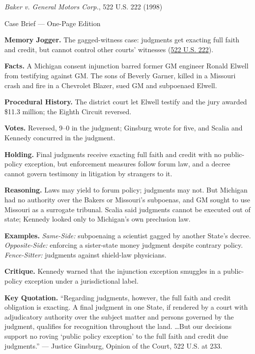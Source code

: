 \documentclass[12pt]{article}
\begin{document}
\begin{center}
{\Large \textit{Baker v. General Motors Corp.}, 522 U.S. 222 (1998)\par}
\vspace{0.3em}
{\normalsize Case Brief --- One-Page Edition\par}
\end{center}

\textbf{Memory Jogger.} The gagged-witness case: judgments get exacting full faith and credit, but cannot control other courts' witnesses (\href{https://supreme.justia.com/cases/federal/us/522/222/}{522 U.S. 222}).

\textbf{Facts.} A Michigan consent injunction barred former GM engineer Ronald Elwell from testifying against GM. The sons of Beverly Garner, killed in a Missouri crash and fire in a Chevrolet Blazer, sued GM and subpoenaed Elwell.

\textbf{Procedural History.} The district court let Elwell testify and the jury awarded \$11.3 million; the Eighth Circuit reversed.

\textbf{Votes.} Reversed, 9--0 in the judgment; Ginsburg wrote for five, and Scalia and Kennedy concurred in the judgment.

\textbf{Holding.} Final judgments receive exacting full faith and credit with no public-policy exception, but enforcement measures follow forum law, and a decree cannot govern testimony in litigation by strangers to it.

\textbf{Reasoning.} Laws may yield to forum policy; judgments may not. But Michigan had no authority over the Bakers or Missouri's subpoenas, and GM sought to use Missouri as a surrogate tribunal. Scalia said judgments cannot be executed out of state; Kennedy looked only to Michigan's own preclusion law.

\textbf{Examples.} \emph{Same-Side:} subpoenaing a scientist gagged by another State's decree. \emph{Opposite-Side:} enforcing a sister-state money judgment despite contrary policy. \emph{Fence-Sitter:} judgments against shield-law physicians.

\textbf{Critique.} Kennedy warned that the injunction exception smuggles in a public-policy exception under a jurisdictional label.

\textbf{Key Quotation.} ``Regarding judgments, however, the full faith and credit obligation is exacting. A final judgment in one State, if rendered by a court with adjudicatory authority over the subject matter and persons governed by the judgment, qualifies for recognition throughout the land. \ldots But our decisions support no roving `public policy exception' to the full faith and credit due judgments.'' --- Justice Ginsburg, Opinion of the Court, 522 U.S. at 233.
\end{document}

